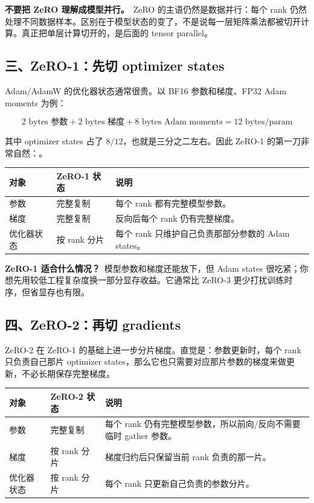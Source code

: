 \begin{intubox}
\textbf{不要把 ZeRO 理解成模型并行。}\
ZeRO 的主语仍然是数据并行：每个 rank 仍然处理不同数据样本。区别在于模型状态的变了，不是说每一层矩阵乘法都被切开计算。真正把单层计算切开的，是后面的 tensor parallel。
\end{intubox}

\subsection{三、ZeRO-1：先切 optimizer states}

Adam/AdamW 的优化器状态通常很贵。以 BF16 参数和梯度、FP32 Adam moments 为例：

\[
2\text{ bytes 参数} + 2\text{ bytes 梯度} + 8\text{ bytes Adam moments}
= 12\text{ bytes/param}
\]

其中 optimizer states 占了 $8/12$，也就是三分之二左右。因此 ZeRO-1 的第一刀非常自然：。

\begin{center}
{\small
\begin{tabular}{p{3.2cm}p{4.2cm}p{5.1cm}}
\hline
\textbf{对象} & \textbf{ZeRO-1 状态} & \textbf{说明} \\
\hline
参数 & 完整复制 & 每个 rank 都有完整模型参数。 \\
梯度 & 完整复制 & 反向后每个 rank 仍有完整梯度。 \\
优化器状态 & 按 rank 分片 & 每个 rank 只维护自己负责那部分参数的 Adam states。 \\
\hline
\end{tabular}
}
\end{center}

\begin{summarybox}
\textbf{ZeRO-1 适合什么情况？}\
模型参数和梯度还能放下，但 Adam states 很吃紧；你想先用较低工程复杂度换一部分显存收益。它通常比 ZeRO-3 更少打扰训练时序，但省显存也有限。
\end{summarybox}

\subsection{四、ZeRO-2：再切 gradients}

ZeRO-2 在 ZeRO-1 的基础上进一步分片梯度。直觉是：参数更新时，每个 rank 只负责自己那片 optimizer states，那么它也只需要对应那片参数的梯度来做更新，不必长期保存完整梯度。

\begin{center}
{\small
\begin{tabular}{p{3.2cm}p{4.2cm}p{5.1cm}}
\hline
\textbf{对象} & \textbf{ZeRO-2 状态} & \textbf{说明} \\
\hline
参数 & 完整复制 & 每个 rank 仍有完整模型参数，所以前向/反向不需要临时 gather 参数。 \\
梯度 & 按 rank 分片 & 梯度归约后只保留当前 rank 负责的那一片。 \\
优化器状态 & 按 rank 分片 & 每个 rank 只更新自己负责的参数分片。 \\
\hline
\end{tabular}
}
\end{center}

